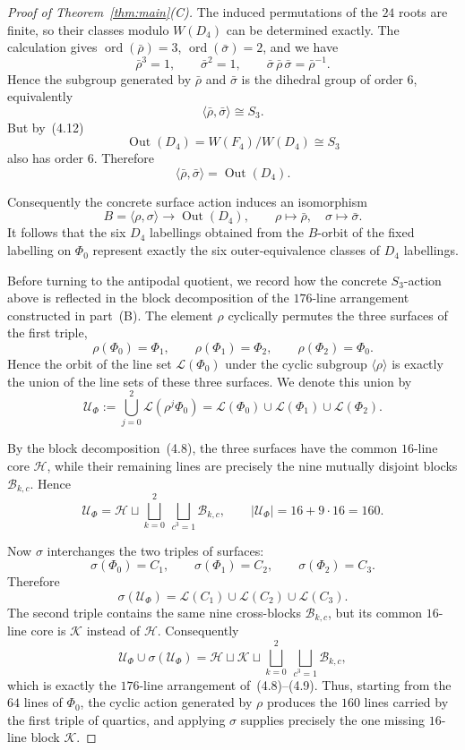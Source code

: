 \documentclass[10pt]{article}
\begin{document}
\begin{proof}[Proof of Theorem~\ref{thm:main}\textup{(C)}]
The induced permutations of the $24$ roots are finite, so their classes
modulo $W(D_4)$ can be determined exactly.  The calculation gives
$\operatorname{ord}(\bar\rho)=3$, $\operatorname{ord}(\bar\sigma)=2$, and we have
\[\bar\rho{}^3=1,\qquad \bar\sigma{}^2=1, 
\qquad
\bar\sigma\,\bar\rho\,\bar\sigma=\bar\rho^{-1}.
\]
Hence the subgroup generated by $\bar\rho$ and $\bar\sigma$ is the
dihedral group of order $6$, equivalently
\[
\langle\bar\rho,\bar\sigma\rangle\cong S_3.
\]
But by~(4.12)
\[
\operatorname{Out}(D_4)
=
W(F_4)/W(D_4)
\cong S_3
\]
also has order $6$.  Therefore
\[
\langle\bar\rho,\bar\sigma\rangle
=
\operatorname{Out}(D_4).
\]

Consequently the concrete surface action induces an isomorphism
\[
B=\langle\rho,\sigma\rangle
\longrightarrow
\operatorname{Out}(D_4),
\qquad
\rho\longmapsto\bar\rho,\quad
\sigma\longmapsto\bar\sigma.
\]
It follows that the six $D_4$ labellings obtained from the $B$-orbit of
the fixed labelling on $\Phi_0$ represent exactly the six
outer-equivalence classes of $D_4$ labellings.

Before turning to the antipodal quotient, we record how the concrete
$S_3$-action above is reflected in the block decomposition of the
$176$-line arrangement constructed in part~\textup{(B)}.  The element
$\rho$ cyclically permutes the three surfaces of the first triple,
\[
\rho(\Phi_0)=\Phi_1,\qquad
\rho(\Phi_1)=\Phi_2,\qquad
\rho(\Phi_2)=\Phi_0.
\]
Hence the orbit of the line set $\mathcal L(\Phi_0)$ under the cyclic
subgroup $\langle\rho\rangle$ is exactly the union of the line sets of
these three surfaces.  We denote this union by
\[
\mathcal U_{\Phi}
:=
\bigcup_{j=0}^{2}\mathcal L(\rho^j\Phi_0)
=
\mathcal L(\Phi_0)\cup
\mathcal L(\Phi_1)\cup
\mathcal L(\Phi_2).
\]

By the block decomposition~(4.8), the three surfaces have the common
$16$-line core $\mathcal H$, while their remaining lines are precisely
the nine mutually disjoint blocks $\mathcal B_{k,c}$.  Hence
\[
\mathcal U_{\Phi}
=
\mathcal H\sqcup
\bigsqcup_{k=0}^{2}\ \bigsqcup_{c^3=1}\mathcal B_{k,c},
\qquad
|\mathcal U_{\Phi}|=16+9\cdot16=160.
\tag{4.13}
\]

Now $\sigma$ interchanges the two triples of surfaces:
\[
\sigma(\Phi_0)=C_1,\qquad
\sigma(\Phi_1)=C_2,\qquad
\sigma(\Phi_2)=C_3.
\]
Therefore
\[
\sigma(\mathcal U_{\Phi})
=
\mathcal L(C_1)\cup
\mathcal L(C_2)\cup
\mathcal L(C_3).
\]
The second triple contains the same nine cross-blocks
$\mathcal B_{k,c}$, but its common $16$-line core is $\mathcal K$
instead of $\mathcal H$.  Consequently
\[
\mathcal U_{\Phi}\cup\sigma(\mathcal U_{\Phi})
=
\mathcal H\sqcup\mathcal K\sqcup
\bigsqcup_{k=0}^{2}\ \bigsqcup_{c^3=1}\mathcal B_{k,c},
\]
which is exactly the $176$-line arrangement of~(4.8)--(4.9).  Thus,
starting from the $64$ lines of $\Phi_0$, the cyclic action generated
by $\rho$ produces the $160$ lines carried by the first triple of
quartics, and applying $\sigma$ supplies precisely the one missing
$16$-line block $\mathcal K$.



\end{proof}
\end{document}
